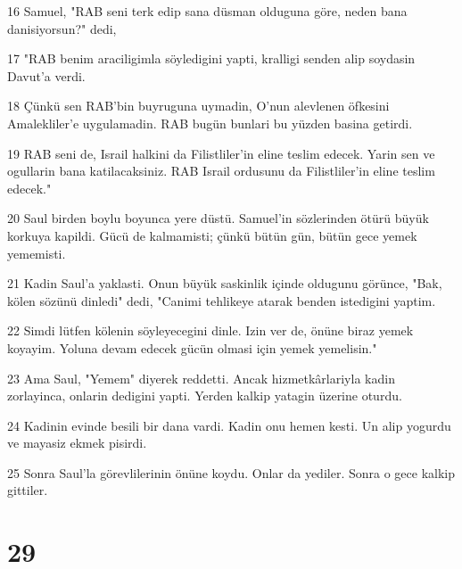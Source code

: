 \par 16 Samuel, "RAB seni terk edip sana düsman olduguna göre, neden bana danisiyorsun?" dedi,
\par 17 "RAB benim araciligimla söyledigini yapti, kralligi senden alip soydasin Davut'a verdi.
\par 18 Çünkü sen RAB'bin buyruguna uymadin, O'nun alevlenen öfkesini Amalekliler'e uygulamadin. RAB bugün bunlari bu yüzden basina getirdi.
\par 19 RAB seni de, Israil halkini da Filistliler'in eline teslim edecek. Yarin sen ve ogullarin bana katilacaksiniz. RAB Israil ordusunu da Filistliler'in eline teslim edecek."
\par 20 Saul birden boylu boyunca yere düstü. Samuel'in sözlerinden ötürü büyük korkuya kapildi. Gücü de kalmamisti; çünkü bütün gün, bütün gece yemek yememisti.
\par 21 Kadin Saul'a yaklasti. Onun büyük saskinlik içinde oldugunu görünce, "Bak, kölen sözünü dinledi" dedi, "Canimi tehlikeye atarak benden istedigini yaptim.
\par 22 Simdi lütfen kölenin söyleyecegini dinle. Izin ver de, önüne biraz yemek koyayim. Yoluna devam edecek gücün olmasi için yemek yemelisin."
\par 23 Ama Saul, "Yemem" diyerek reddetti. Ancak hizmetkârlariyla kadin zorlayinca, onlarin dedigini yapti. Yerden kalkip yatagin üzerine oturdu.
\par 24 Kadinin evinde besili bir dana vardi. Kadin onu hemen kesti. Un alip yogurdu ve mayasiz ekmek pisirdi.
\par 25 Sonra Saul'la görevlilerinin önüne koydu. Onlar da yediler. Sonra o gece kalkip gittiler.

\chapter{29}

